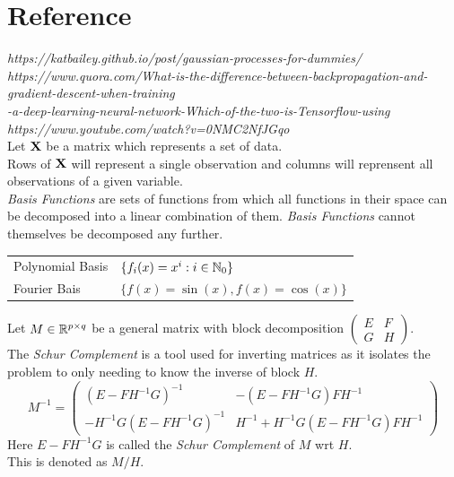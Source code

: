 \documentclass[11pt,a4paper]{article}
\begin{document}
\newpage
\setcounter{section}{-1}
\section{Reference}

\textit{https://katbailey.github.io/post/gaussian-processes-for-dummies/}\\
\textit{https://www.quora.com/What-is-the-difference-between-backpropagation-and-gradient-descent-when-training}\\\textit{-a-deep-learning-neural-network-Which-of-the-two-is-Tensorflow-using}\\
\textit{https://www.youtube.com/watch?v=0NMC2NfJGqo}\\

Let $\textbf{X}$ be a matrix which represents a set of data.\\
Rows of $\textbf{X}$ will represent a single observation and columns will reprensent all observations of a given variable.\\

\textit{Basis Functions} are sets of functions from which all functions in their space can be decomposed into a linear combination of them. \textit{Basis Functions} cannot themselves be decomposed any further.
\begin{center}\begin{tabular}{l|l}
Polynomial Basis&$\{f_i(x)=x^i:i\in\mathbb{N}_0\}$\\
Fourier Bais&$\{f(x)=\sin(x),f(x)=\cos(x)\}$
\end{tabular}\end{center}

Let $M\in\mathbb{R}^{p\times q}$ be a general matrix with block decomposition $\begin{pmatrix}E&F\\G&H\end{pmatrix}$.\\
The \textit{Schur Complement} is a tool used for inverting matrices as it isolates the problem to only needing to know the inverse of block $H$.\\
$$M^{-1}=\begin{pmatrix}(E-FH^{-1}G)^{-1}&-(E-FH^{-1}G)FH^{-1}\\-H^{-1}G(E-FH^{-1}G)^{-1}&H^{-1}+H^{-1}G(E-FH^{-1}G)FH^{-1}\end{pmatrix}$$
Here $E-FH^{-1}G$ is called the \textit{Schur Complement} of $M$ wrt $H$.\\
\nb This is denoted as $M/H$.\\
\end{document}
